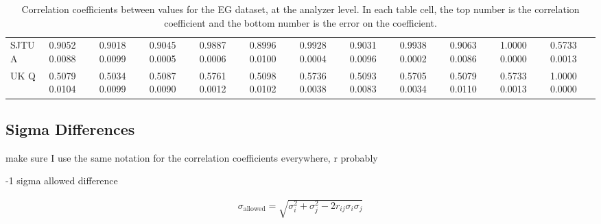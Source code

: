 \begin{landscape}
\begin{table}
\begin{tabularx}{1\linewidth}{@{\extracolsep{\fill}}lXXXXXXXXXXX}
	SJTU A & 0.9052 0.0088 & 0.9018 0.0099 & 0.9045 0.0005 & 0.9887 0.0006 & 0.8996 0.0100 & 0.9928 0.0004 & 0.9031 0.0096 & 0.9938 0.0002 & 0.9063 0.0086 & 1.0000 0.0000 & 0.5733 0.0013  \\
	UK Q   & 0.5079 0.0104 & 0.5034 0.0099 & 0.5087 0.0090 & 0.5761 0.0012 & 0.5098 0.0102 & 0.5736 0.0038 & 0.5093 0.0083 & 0.5705 0.0034 & 0.5079 0.0110 & 0.5733 0.0013 & 1.0000 0.0000  \\
  \bottomrule
\end{tabularx}
\caption[]{Correlation coefficients between \R values for the EG dataset, at the analyzer level. In each table cell, the top number is the correlation coefficient and the bottom number is the error on the coefficient.}
\label{tab:Corrs_EG_analyzer}
\end{table}
\end{landscape}









\subsection{Sigma Differences}



make sure I use the same notation for the correlation coefficients everywhere, r probably

-1 sigma allowed difference

\begin{align}
	\sigma_{\text{allowed}} = \sqrt{\sigma^{2}_{i} + \sigma^{2}_{j} - 2r_{ij}\sigma_{i}\sigma_{j}}
\end{align}


